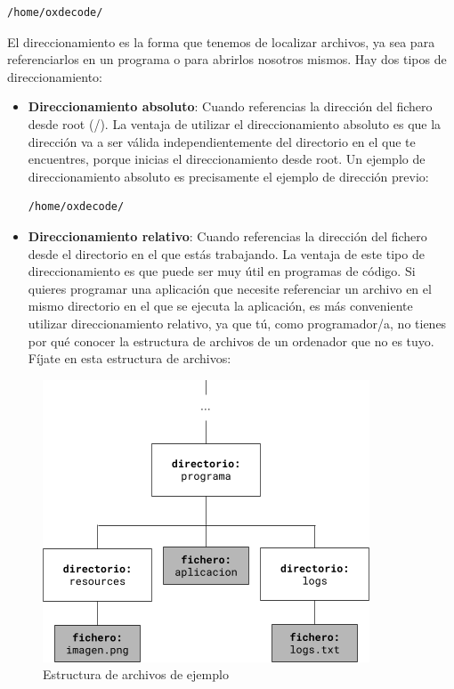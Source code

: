 \begin{tcolorbox-code}
\begin{lstlisting}
/home/oxdecode/
\end{lstlisting}
\end{tcolorbox-code}

El direccionamiento es la forma que tenemos de localizar archivos, ya sea para referenciarlos en un programa o para abrirlos nosotros mismos. Hay dos tipos de direccionamiento:

\begin{itemize}
    \item \textbf{Direccionamiento absoluto}: Cuando referencias la dirección del fichero desde root (/). La ventaja de utilizar el direccionamiento absoluto es que la dirección va a ser válida independientemente del directorio en el que te encuentres, porque inicias el direccionamiento desde root. Un ejemplo de direccionamiento absoluto es precisamente el ejemplo de dirección previo:
    \begin{tcolorbox-code}
\begin{lstlisting}
/home/oxdecode/
\end{lstlisting}
\end{tcolorbox-code}
    \item \textbf{Direccionamiento relativo}: Cuando referencias la dirección del fichero desde el directorio en el que estás trabajando. La ventaja de este tipo de direccionamiento es que puede ser muy útil en programas de código. Si quieres programar una aplicación que necesite referenciar un archivo en el mismo directorio en el que se ejecuta la aplicación, es más conveniente utilizar direccionamiento relativo, ya que tú, como programador/a, no tienes por qué conocer la estructura de archivos de un ordenador que no es tuyo. Fíjate en esta estructura de archivos:
\end{itemize}

\begin{figure}[H]
    \centering
    \includegraphics[width=0.80\linewidth]{resources/images/estructura-archivos-1.png}
    \caption{Estructura de archivos de ejemplo}
\end{figure}

